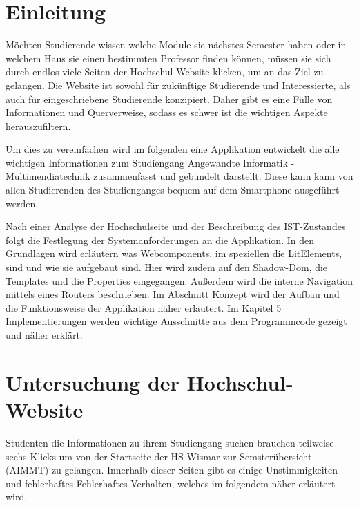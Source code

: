 \documentclass[12pt,					%
							 oneside,			%
							 a4paper,			%
							 halfparskip,		%
							 liststotoc,			%
							 bibtotoc,			%
							 fleqn,				%
							 pointlessnumbers]	%
							 {scrreprt}
\newcommand{\blankpage}{
	\newpage
	\thispagestyle{empty}
	\mbox{}
	\newpage
}
\begin{document}
	\onehalfspacing 					%
	
	\tableofcontents					%


\newpage

\chapter{Einleitung}
Möchten Studierende wissen welche Module sie nächstes Semester haben oder in welchem Haus sie einen bestimmten Professor finden können, müssen sie sich durch endlos viele Seiten der Hochschul-Website klicken, um an das Ziel zu gelangen. Die Website ist sowohl für zukünftige Studierende und Interessierte, als auch für eingeschriebene Studierende konzipiert. Daher gibt es eine Fülle von Informationen und Querverweise, sodass es schwer ist die wichtigen Aspekte herauszufiltern.

Um dies zu vereinfachen wird im folgenden eine Applikation entwickelt die alle wichtigen Informationen zum Studiengang Angewandte Informatik - Multimendiatechnik zusammenfasst und gebündelt darstellt. Diese kann kann von allen Studierenden des Studienganges bequem auf dem Smartphone ausgeführt werden.

Nach einer Analyse der Hochschulseite und der Beschreibung des IST-Zustandes folgt die Festlegung der Systemanforderungen an die Applikation. In den Grundlagen wird erläutern was Webcomponents, im speziellen die LitElements, sind und wie sie aufgebaut sind. Hier wird zudem auf den Shadow-Dom, die Templates und die Properties eingegangen. Außerdem wird die interne Navigation mittels eines Routers beschrieben. Im Abschnitt Konzept wird der Aufbau und die Funktionsweise der Applikation näher erläutert. Im Kapitel 5 Implementierungen werden wichtige Ausschnitte aus dem Programmcode gezeigt und näher erklärt.

\chapter{Untersuchung der Hochschul-Website}	
Studenten die Informationen zu ihrem Studiengang suchen brauchen teilweise sechs Klicks um von der Startseite der HS Wismar zur Semsterübersicht (AIMMT) zu gelangen. Innerhalb dieser Seiten gibt es einige Unstimmigkeiten und fehlerhaftes Fehlerhaftes Verhalten, welches im folgendem näher erläutert wird.
\end{document}
